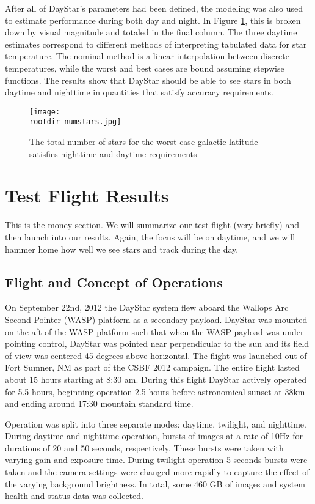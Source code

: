 \documentclass[twocolumn,letterpaper]{IEEEAerospace2012}
\newcommand{\rootdir}{./Figures/}
\begin{document}
After all of DayStar's parameters had been defined, the modeling was also used to estimate performance during both day and night. In Figure \ref{fig:numstars}, this is broken down by visual magnitude and totaled in the final column. The three daytime estimates correspond to different methods of interpreting tabulated data for star temperature. The nominal method is a linear interpolation between discrete temperatures, while the worst and best cases are bound assuming stepwise functions. The results show that DayStar should be able to see stars in both daytime and nighttime in quantities that satisfy accuracy requirements. 
\begin{figure}[H]
    \label{fig:numstars}
    \texttt{[image: \\rootdir numstars.jpg]}
    \caption{The total number of stars for the worst case galactic latitude satisfies nighttime and daytime requirements}
\end{figure}

\section{Test Flight Results}
This is the money section. We will summarize our test flight (very briefly) and then launch into our results. Again, the focus will be on daytime, and we will hammer home how well we see stars and track during the day.

\subsection{Flight and Concept of Operations}
On September 22nd, 2012 the DayStar system flew aboard the Wallops Arc Second Pointer (WASP) platform as a secondary payload. DayStar was mounted on the aft of the WASP platform such that when the WASP payload was under pointing control, DayStar was pointed near perpendicular to the sun and its field of view was centered 45 degrees above horizontal. The flight was launched out of Fort Sumner, NM as part of the CSBF 2012 campaign. The entire flight lasted about 15 hours starting at 8:30 am. During this flight DayStar actively operated for 5.5 hours, beginning operation 2.5 hours before astronomical sunset at 38km and ending around 17:30 mountain standard time. 

Operation was split into three separate modes: daytime, twilight, and nighttime. During daytime and nighttime operation, bursts of images at a rate of 10Hz for durations of 20 and 50 seconds, respectively. These bursts were taken with varying gain and exposure time. During twilight operation 5 seconds bursts were taken and the camera settings were changed more rapidly to capture the effect of the varying background brightness. In total, some 460 GB of images and system health and status data was collected. 
\end{document}
